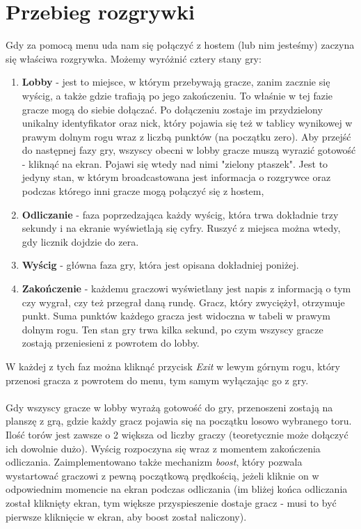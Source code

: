 \documentclass[]{report}
\begin{document}
\chapter*{Przebieg rozgrywki}
\quad Gdy za pomocą menu uda nam się połączyć z hostem (lub nim jesteśmy) zaczyna się właściwa rozgrywka. Możemy wyróżnić cztery stany gry:
\begin{enumerate}
	\item \textbf{Lobby} - jest to miejsce, w którym przebywają gracze, zanim zacznie się wyścig, a także gdzie trafiają po jego zakończeniu. To właśnie w tej fazie gracze mogą do siebie dołączać. Po dołączeniu zostaje im przydzielony unikalny identyfikator oraz nick, który pojawia się też w tablicy wynikowej w prawym dolnym rogu wraz z liczbą punktów (na początku zero). Aby przejść do następnej fazy gry, wszyscy obecni w lobby gracze muszą wyrazić gotowość - kliknąć na ekran. Pojawi się wtedy nad nimi "zielony ptaszek". Jest to jedyny stan, w którym broadcastowana jest informacja o rozgrywce oraz podczas którego inni gracze mogą połączyć się z hostem,
	\item \textbf{Odliczanie} - faza poprzedzająca każdy wyścig, która trwa dokładnie trzy sekundy i na ekranie wyświetlają się cyfry. Ruszyć z miejsca można wtedy, gdy licznik dojdzie do zera.
	\item \textbf{Wyścig} - główna faza gry, która jest opisana dokładniej poniżej.
	\item \textbf{Zakończenie} - każdemu graczowi wyświetlany jest napis z informacją o tym czy wygrał, czy też przegrał daną rundę. Gracz, który zwyciężył, otrzymuje punkt. Suma punktów każdego gracza jest widoczna w tabeli w prawym dolnym rogu. Ten stan gry trwa kilka sekund, po czym wszyscy gracze zostają przeniesieni z powrotem do lobby.
\end{enumerate}
W każdej z tych faz można kliknąć przycisk \textit{Exit} w lewym górnym rogu, który przenosi gracza z powrotem do menu, tym samym wyłączając go z gry. \\\\
Gdy wszyscy gracze w lobby wyrażą gotowość do gry, przenoszeni zostają na planszę z grą, gdzie każdy gracz pojawia się na początku losowo wybranego toru. Ilość torów jest zawsze o 2 większa od liczby graczy (teoretycznie może dołączyć ich dowolnie dużo).
Wyścig rozpoczyna się wraz z momentem zakończenia odliczania. Zaimplementowano także mechanizm \textit{boost}, który pozwala wystartować graczowi z pewną początkową prędkością, jeżeli kliknie on w odpowiednim momencie na ekran podczas odliczania (im bliżej końca odliczania został kliknięty ekran, tym większe przyspieszenie dostaje gracz - musi to być pierwsze kliknięcie w ekran, aby boost został naliczony).\\
\end{document}
